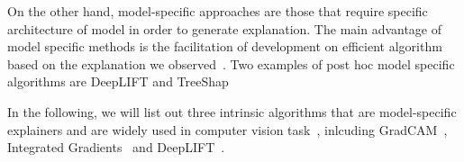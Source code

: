 \begin{itemize}
\end{itemize}

On the other hand, model-specific approaches are those that require specific architecture of model in order to generate explanation. The main advantage of model specific methods is the facilitation of development on efficient algorithm based on the explanation we observed~\citep{Belle2020XAIPriciples}. Two examples of post hoc model specific algorithms are DeepLIFT \citep{} and TreeShap \citep{}


In the following, we will list out three intrinsic algorithms that are model-specific explainers and are widely used in computer vision task~\citep{Spinner2020explAIner}, inlcuding GradCAM~\citep{Selvaraju2017GradCAM}, Integrated Gradients~\citep{Sundararajan2017IntegratedGradient} and DeepLIFT~\citep{Shrikumar2017DeepLIFT}.


